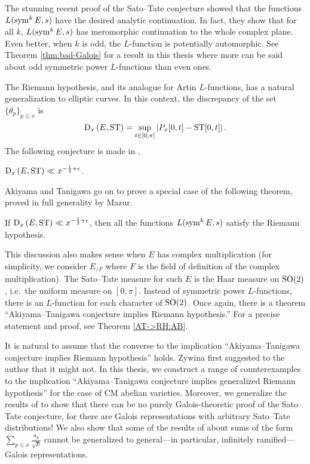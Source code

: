 The stunning recent proof of the Sato--Tate conjecture 
\cite{harris-shepherd-barron-taylor-2010} 
showed that the functions $L(\operatorname{sym}^k E,s)$ have the desired analytic 
continuation. In fact, they show that for all $k$, $L(\operatorname{sym}^k E,s)$ has 
meromorphic continuation to the whole complex plane. Even better, when $k$ is 
odd, the $L$-function is potentially automorphic. See Theorem 
\ref{thm:bad-Galois} for a result in this thesis where more can be said about 
odd symmetric power $L$-functions than even ones. 

The Riemann hypothesis, and its analogue for Artin $L$-functions, has a natural 
generalization to elliptic curves. In this context, the discrepancy of the set 
$\{\theta_p\}_{p\leqslant x}$ is 
\[
	\operatorname{D}_x\left(E,\mathrm{ST}\right) = \sup_{t\in [0,\pi]} \left| P_x[0,t] - \mathrm{ST}[0,t]\right| .
\]
The following conjecture is made in \cite{akiyama-tanigawa-1999}.

\begin{conjecture}
$\operatorname{D}_x\left(E,\mathrm{ST}\right)\ll x^{-\frac 1 2+\epsilon}$.
\end{conjecture}

Akiyama and Tanigawa go on to prove a special case of the following theorem, 
proved in full generality by Mazur. 

\begin{theorem}
If $\operatorname{D}_x\left(E,\mathrm{ST}\right)\ll x^{-\frac 1 2+\epsilon}$, 
then all the functions $L(\operatorname{sym}^k E, s)$ satisfy the Riemann hypothesis. 
\end{theorem}

This discussion also makes sense when $E$ has complex multiplication (for 
simplicity, we consider $E_{/F}$ where $F$ is the field of definition of the 
complex multiplication). The Sato--Tate measure for such $E$ is the Haar 
measure on $\operatorname{SO}(2)$, i.e.~the uniform measure on $[0,\pi]$. Instead of 
symmetric power $L$-functions, there is an $L$-function for each character of 
$\operatorname{SO}(2)$. Once again, there is a theorem ``Akiyama--Tanigawa conjecture implies 
Riemann hypothesis.'' For a precise statement and proof, see Theorem 
\ref{AT->RH:AB}. 

It is natural to assume that the converse to the implication 
``Akiyama--Tanigawa conjecture implies Riemann hypothesis'' holds. Zywina 
first suggested to the author that it might not. In this thesis, we construct a 
range of counterexamples to the implication ``Akiyama--Tanigawa conjecture implies 
generalized Riemann hypothesis'' for the case of CM abelian varieties. 
Moreover, we generalize the results of \cite{pande-2011} to show that there can 
be no purely Galois-theoretic proof of the Sato--Tate conjecture, for there are 
Galois representations with arbitrary Sato--Tate distributions! We also show 
that some of the results of \cite{sarnak-2007} about sums of the form 
$\sum_{p\leqslant x} \frac{a_p}{\sqrt p}$ cannot be generalized to 
general---in particular, infinitely ramified---Galois representations. 





